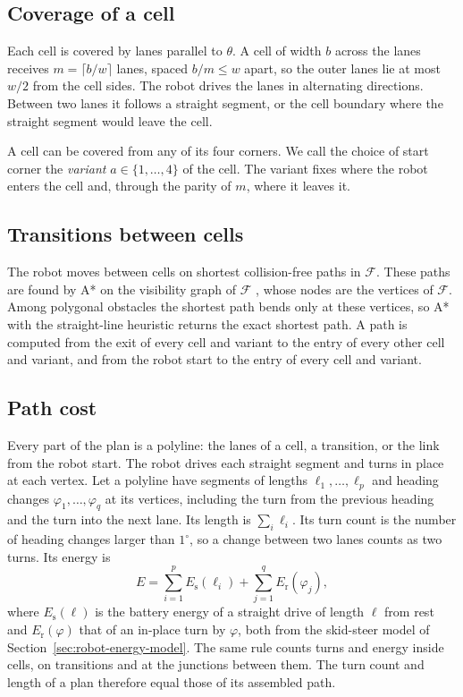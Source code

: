 \subsection{Coverage of a cell}
\label{sec:method-lanes}

Each cell is covered by lanes parallel to $\theta$.
A cell of width $b$ across the lanes receives $m = \lceil b / w \rceil$ lanes, spaced $b/m \le w$ apart, so the outer lanes lie at most $w/2$ from the cell sides.
The robot drives the lanes in alternating directions.
Between two lanes it follows a straight segment, or the cell boundary where the straight segment would leave the cell.

A cell can be covered from any of its four corners.
We call the choice of start corner the \emph{variant} $a \in \{1,\dots,4\}$ of the cell.
The variant fixes where the robot enters the cell and, through the parity of $m$, where it leaves it.

\subsection{Transitions between cells}
\label{sec:method-transitions}

The robot moves between cells on shortest collision-free paths in $\mathcal{F}$.
These paths are found by A* \cite{hartFormalBasisHeuristic1968} on the visibility graph of $\mathcal{F}$ \cite{lozano-perezAlgorithmPlanningCollisionfree1979}, whose nodes are the vertices of $\mathcal{F}$.
Among polygonal obstacles the shortest path bends only at these vertices, so A* with the straight-line heuristic returns the exact shortest path.
A path is computed from the exit of every cell and variant to the entry of every other cell and variant, and from the robot start to the entry of every cell and variant.

\subsection{Path cost}
\label{sec:method-cost}

Every part of the plan is a polyline: the lanes of a cell, a transition, or the link from the robot start.
The robot drives each straight segment and turns in place at each vertex.
Let a polyline have segments of lengths $\ell_1, \dots, \ell_p$ and heading changes $\varphi_1, \dots, \varphi_q$ at its vertices, including the turn from the previous heading and the turn into the next lane.
Its length is $\sum_i \ell_i$.
Its turn count is the number of heading changes larger than $1^\circ$, so a change between two lanes counts as two turns.
Its energy is
\begin{equation}
E = \sum_{i=1}^{p} E_{\mathrm{s}}(\ell_i) + \sum_{j=1}^{q} E_{\mathrm{r}}(\varphi_j),
\label{eq:path-energy}
\end{equation}
where $E_{\mathrm{s}}(\ell)$ is the battery energy of a straight drive of length $\ell$ from rest and $E_{\mathrm{r}}(\varphi)$ that of an in-place turn by $\varphi$, both from the skid-steer model of Section~\ref{sec:robot-energy-model}.
The same rule counts turns and energy inside cells, on transitions and at the junctions between them.
The turn count and length of a plan therefore equal those of its assembled path.

